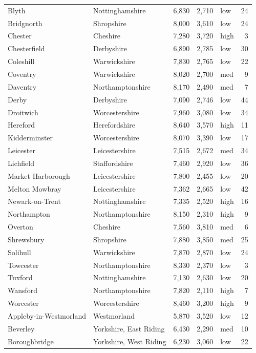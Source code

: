 \documentclass[11pt,a4paper]{article}
\begin{document}
{\begin{longtable}{p{5.4cm}p{4.2cm}rrlr}
Blyth & Nottinghamshire & 6,830 & 2,710 & low & 24\\
Bridgnorth & Shropshire & 8,000 & 3,610 & low & 24\\
Chester & Cheshire & 7,280 & 3,720 & high & 3\\
Chesterfield & Derbyshire & 6,890 & 2,785 & low & 30\\
Coleshill & Warwickshire & 7,830 & 2,765 & low & 22\\
Coventry & Warwickshire & 8,020 & 2,700 & med & 9\\
Daventry & Northamptonshire & 8,170 & 2,490 & med & 7\\
Derby & Derbyshire & 7,090 & 2,746 & low & 44\\
Droitwich & Worcestershire & 7,960 & 3,080 & low & 34\\
Hereford & Herefordshire & 8,640 & 3,570 & high & 11\\
Kidderminster & Worcestershire & 8,070 & 3,390 & low & 17\\
Leicester & Leicestershire & 7,515 & 2,672 & med & 34\\
Lichfield & Staffordshire & 7,460 & 2,920 & low & 36\\
Market Harborough & Leicestershire & 7,800 & 2,455 & low & 20\\
Melton Mowbray & Leicestershire & 7,362 & 2,665 & low & 42\\
Newark-on-Trent & Nottinghamshire & 7,335 & 2,520 & high & 16\\
Northampton & Northamptonshire & 8,150 & 2,310 & high & 9\\
Overton & Cheshire & 7,560 & 3,810 & med & 6\\
Shrewsbury & Shropshire & 7,880 & 3,850 & med & 25\\
Solihull & Warwickshire & 7,870 & 2,870 & low & 24\\
Towcester & Northamptonshire & 8,330 & 2,370 & low & 3\\
Tuxford & Nottinghamshire & 7,130 & 2,630 & low & 20\\
Wansford & Northamptonshire & 7,820 & 2,110 & high & 7\\
Worcester & Worcestershire & 8,460 & 3,200 & high & 9\\
Appleby-in-Westmorland & Westmorland & 5,870 & 3,520 & low & 12\\
Beverley & Yorkshire, East Riding & 6,430 & 2,290 & med & 10\\
Boroughbridge & Yorkshire, West Riding & 6,230 & 3,060 & low & 22\\

\end{longtable}}
\end{document}
